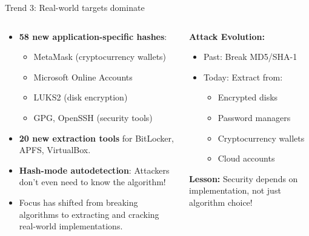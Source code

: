 \documentclass[aspectratio=169, lualatex, handout]{beamer}
\begin{document}
\begin{frame}{Trend 3: Real-world targets dominate}
	\begin{columns}[c]
		\begin{column}{0.55\textwidth}
			\begin{itemize}[<+->]
				\item \textbf{58 new application-specific hashes}:
				      \begin{itemize}
					      \item MetaMask (cryptocurrency wallets)
					      \item Microsoft Online Accounts
					      \item LUKS2 (disk encryption)
					      \item GPG, OpenSSH (security tools)
				      \end{itemize}
				\item \textbf{20 new extraction tools} for BitLocker, APFS, VirtualBox.
				\item \textbf{Hash-mode autodetection}: Attackers don't even need to know the algorithm!
				\item Focus has shifted from breaking algorithms to extracting and cracking real-world implementations.
			\end{itemize}
		\end{column}
		\begin{column}{0.45\textwidth}
			\begin{tcolorbox}[colback=black!5!white,colframe=ciphergray]
				\textbf{Attack Evolution:}
				\begin{itemize}
					\item Past: Break MD5/SHA-1
					\item Today: Extract from:
					      \begin{itemize}
						      \small
						      \item Encrypted disks
						      \item Password managers
						      \item Cryptocurrency wallets
						      \item Cloud accounts
					      \end{itemize}
				\end{itemize}
				\textcolor{cipherprimary}{\textbf{Lesson:} \small Security depends on implementation, not just algorithm choice!}
			\end{tcolorbox}
		\end{column}
	\end{columns}
\end{frame}
\end{document}
